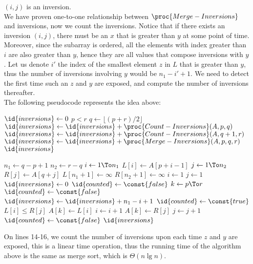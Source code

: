 \begin{enumerate}[leftmargin=*]
		$(i,j)$ is an inversion.\\
		We have proven one-to-one relationship between
		$\proc{Merge-Inversions}$ and inversions, now
		we count the inversions. Notice that if there
		exists an inversion $(i,j)$, there must be
		an $x$ that is greater than $y$ at some point
		of time. Moreover, since the subarray is ordered,
		all the elements with index greater than $i$ are
		also greater than $y$, hence they are all
		values that compose inversions with $y$. Let
		us denote $i'$ the index of the smallest element
		$z$ in $L$ that is greater than $y$, thus the
		number of inversions involving $y$ would be
		$n_1-i'+1$. We need to detect the first time
		such an $z$ and $y$ are exposed, and compute
		the number of inversions thereafter.\\
		The following pseudocode represents the idea
		above:
		\begin{codebox}
		\li	$\id{inversions}\gets 0$
		\li	\If $p<r$
			\Then
		\li		$q\gets\lfloor(p+r)/2\rfloor$
		\li		$\id{inversions}\gets\id{inversions}
				+\proc{Count-Inversions}(A,p,q)$
		\li		$\id{inversions}\gets\id{inversions}
				+\proc{Count-Inversions}(A,q+1,r)$
		\li		$\id{inversions}\gets\id{inversions}
				+\proc{Merge-Inversions}(A,p,q,r)$
			\End
		\li {} $\id{inversions}$
		\end{codebox}
		\begin{codebox}
		\Procname{$\proc{Merge-Inversions}(A,p,q,r)$}
		\li	$n_1\gets q-p+1$
		\li	$n_2\gets r-q$
		\li \For $i\gets 1\To n_1$
			\Do
		\li		$L[i]\gets A[p+i-1]$
			\End
		\li \For $j\gets 1\To n_2$
			\Do
		\li		$R[j]\gets A[q+j]$
			\End
		\li	$L[n_1+1]\gets \infty$
		\li	$R[n_2+1]\gets \infty$
		\li $i\gets 1$
		\li $j\gets 1$
		\li $\id{inversions}\gets 0$
		\li $\id{counted}\gets \const{false}$
		\li \For $k\gets p\To r$
			\Do
		\li		\If $\id{counted}\gets \const{false}$
				\Then
		\li			$\id{inversions}\gets\id{inversions}
					+n_1-i+1$
		\li			$\id{counted}\gets \const{true}$
				\End
		\li		\If $L[i]\le R[j]$
				\Then
		\li			$A[k]\gets L[i]$
		\li			$i\gets i+1$
		\li		\Else
		\li			$A[k]\gets R[j]$
		\li			$j\gets j+1$
		\li			$\id{counted}\gets\const{false}$
				\End
			\End
		\li	{} $\id{inversions}$
		\end{codebox}
		On lines 14-16, we count the number of
		inversions upon each time $z$ and $y$ are
		exposed, this is a linear time operation,
		thus the running time of the algorithm above
		is the same as merge sort, which is $\Theta(n\lg n)$.
\end{enumerate}

